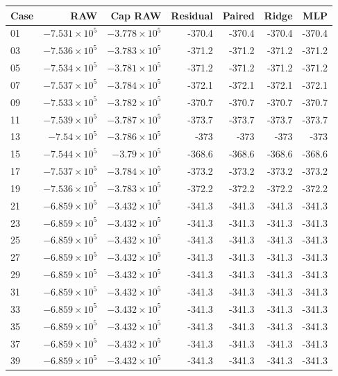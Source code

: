 \begin{tabular}{lrrrrrr}
\toprule
Case & RAW & Cap RAW & Residual & Paired & Ridge & MLP \\
\midrule
01 & \(-7.531\times10^{5}\) & \(-3.778\times10^{5}\) & -370.4 & -370.4 & -370.4 & -370.4 \\
03 & \(-7.536\times10^{5}\) & \(-3.783\times10^{5}\) & -371.2 & -371.2 & -371.2 & -371.2 \\
05 & \(-7.534\times10^{5}\) & \(-3.781\times10^{5}\) & -371.2 & -371.2 & -371.2 & -371.2 \\
07 & \(-7.537\times10^{5}\) & \(-3.784\times10^{5}\) & -372.1 & -372.1 & -372.1 & -372.1 \\
09 & \(-7.533\times10^{5}\) & \(-3.782\times10^{5}\) & -370.7 & -370.7 & -370.7 & -370.7 \\
11 & \(-7.539\times10^{5}\) & \(-3.787\times10^{5}\) & -373.7 & -373.7 & -373.7 & -373.7 \\
13 & \(-7.54\times10^{5}\) & \(-3.786\times10^{5}\) & -373 & -373 & -373 & -373 \\
15 & \(-7.544\times10^{5}\) & \(-3.79\times10^{5}\) & -368.6 & -368.6 & -368.6 & -368.6 \\
17 & \(-7.537\times10^{5}\) & \(-3.784\times10^{5}\) & -373.2 & -373.2 & -373.2 & -373.2 \\
19 & \(-7.536\times10^{5}\) & \(-3.783\times10^{5}\) & -372.2 & -372.2 & -372.2 & -372.2 \\
21 & \(-6.859\times10^{5}\) & \(-3.432\times10^{5}\) & -341.3 & -341.3 & -341.3 & -341.3 \\
23 & \(-6.859\times10^{5}\) & \(-3.432\times10^{5}\) & -341.3 & -341.3 & -341.3 & -341.3 \\
25 & \(-6.859\times10^{5}\) & \(-3.432\times10^{5}\) & -341.3 & -341.3 & -341.3 & -341.3 \\
27 & \(-6.859\times10^{5}\) & \(-3.432\times10^{5}\) & -341.3 & -341.3 & -341.3 & -341.3 \\
29 & \(-6.859\times10^{5}\) & \(-3.432\times10^{5}\) & -341.3 & -341.3 & -341.3 & -341.3 \\
31 & \(-6.859\times10^{5}\) & \(-3.432\times10^{5}\) & -341.3 & -341.3 & -341.3 & -341.3 \\
33 & \(-6.859\times10^{5}\) & \(-3.432\times10^{5}\) & -341.3 & -341.3 & -341.3 & -341.3 \\
35 & \(-6.859\times10^{5}\) & \(-3.432\times10^{5}\) & -341.3 & -341.3 & -341.3 & -341.3 \\
37 & \(-6.859\times10^{5}\) & \(-3.432\times10^{5}\) & -341.3 & -341.3 & -341.3 & -341.3 \\
39 & \(-6.859\times10^{5}\) & \(-3.432\times10^{5}\) & -341.3 & -341.3 & -341.3 & -341.3 \\
\bottomrule
\end{tabular}
